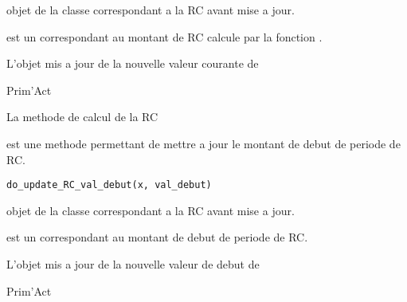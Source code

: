 \documentclass[a4paper]{book}
\begin{document}
%
\begin{Arguments}
\begin{ldescription}
\item[\code{x}] objet de la classe correspondant a la RC avant mise a jour.

\item[\code{val\_courante}] est un  correspondant au montant de RC calcule par la fonction .
\end{ldescription}
\end{Arguments}
%
\begin{Value}
L'objet  mis a jour de la nouvelle valeur courante de 
\end{Value}
%
\begin{Author}\relax
Prim'Act
\end{Author}
%
\begin{SeeAlso}\relax
La methode de calcul de la RC 
\end{SeeAlso}
%
\begin{Description}\relax
{} est une methode permettant de mettre a jour le montant de debut de periode de RC.
\end{Description}
%
\begin{Usage}
\begin{verbatim}
do_update_RC_val_debut(x, val_debut)
\end{verbatim}
\end{Usage}
%
\begin{Arguments}
\begin{ldescription}
\item[\code{x}] objet de la classe  correspondant a la RC avant mise a jour.

\item[\code{val\_debut}] est un  correspondant au montant de debut de periode de RC.
\end{ldescription}
\end{Arguments}
%
\begin{Value}
L'objet  mis a jour de la nouvelle valeur de debut de 
\end{Value}
%
\begin{Author}\relax
Prim'Act
\end{Author}
\end{document}

